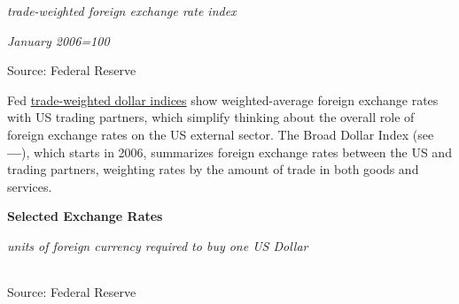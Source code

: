 \documentclass{report}
\makeatletter
\newcommand{\tbllink}[1]{\href{https://raw.githubusercontent.com/bdecon/US-chartbook/master/chartbook/data/#1}{\faTable}}
\newcommand*\short[1]{\expandafter\@gobbletwo\number\numexpr#1\relax}
\newcommand{\dateaxisticks}{
		date coordinates in=x, axis line style={draw=none},
		xmax={2020-08-10},
		max space between ticks=40,	    
		xtick={{1990-01-01}, {1992-01-01}, {1994-01-01}, 
			{1996-01-01}, {1998-01-01}, {2000-01-01}, 
			{2002-01-01}, {2004-01-01}, {2006-01-01},
			{2008-01-01}, {2010-01-01}, {2012-01-01}, {2014-01-01},
		    {2016-01-01}, {2018-01-01}, {2020-01-01}},
		minor xtick={{1989-01-01}, {1991-01-01}, {1993-01-01},
			{1995-01-01}, {1997-01-01}, {1999-01-01}, 
			{2001-01-01}, {2003-01-01}, {2005-01-01}, {2007-01-01},
		    {2009-01-01}, {2011-01-01}, {2013-01-01}, {2015-01-01},
		    {2017-01-01}, {2019-01-01}},
		enlarge y limits={0.06}, enlarge x limits={0.01},
		}
\newcommand{\bbar}[2]{extra #1 ticks = {{#2}}, extra #1 tick labels = ,
		extra #1 tick style = {grid=major, grid style={thick, black!25}},}
\newcommand{\stdline}[4]{\addplot[very thick, no markers, color=#1] 
		table [x=#2, y=#3, col sep=comma] {#4};	}
\newcommand{\rbars}{
		\fill[color=black!10] (axis cs:{1990-07-01},\pgfkeysvalueof{/pgfplots/ymin}) rectangle 
			(axis cs:{1991-03-01}, \pgfkeysvalueof{/pgfplots/ymax});
		\fill[color=black!10] (axis cs:{2007-12-01},\pgfkeysvalueof{/pgfplots/ymin}) rectangle 
			(axis cs:{2009-07-01}, \pgfkeysvalueof{/pgfplots/ymax});
		\fill[color=black!10] (axis cs:{2001-03-01},\pgfkeysvalueof{/pgfplots/ymin}) rectangle 
			(axis cs:{2001-11-01}, \pgfkeysvalueof{/pgfplots/ymax});
		\fill[color=black!10] (axis cs:{2020-02-01},\pgfkeysvalueof{/pgfplots/ymin}) rectangle 
			(axis cs:{2020-09-01}, \pgfkeysvalueof{/pgfplots/ymax});}
\makeatother
\begin{document}
{{{{{{\begin{minipage}{0.33\textwidth}
\footnotesize{\textit{trade-weighted foreign exchange rate index}}

\footnotesize{\textit{January 2006=100}}

\hspace*{-2mm} 

\footnotesize{Source: Federal Reserve} \hfill \tbllink{fx_idx.csv}
\end{minipage}\hspace{8mm}
\begin{minipage}{0.375\textwidth}
\small Fed \href{https://www.federalreserve.gov/releases/h10/summary/default.htm}{trade-weighted dollar indices} show weighted-average foreign exchange rates with US trading partners, which simplify thinking about the overall role of foreign exchange rates on the US external sector. The Broad Dollar Index (see {\color{blue!60!black}\textbf{---}}), which starts in 2006, summarizes foreign exchange rates between the US and trading partners, weighting rates by the amount of trade in both goods and services.\\


\end{minipage}

\newpage

\normalsize \textbf{Selected Exchange Rates}
\vspace{-2mm}

\footnotesize{\textit{units of foreign currency required to buy one US Dollar}}
\vspace{-1mm}

 \setlength{\tabcolsep}{3.0pt} \color{black!90}
		{\renewcommand{\arraystretch}{1.52}
		 \hspace{-1mm}\begin{tabular}{p{16mm} R{15mm} R{15mm} R{15mm} R{14.5mm} 
		 				 R{14.5mm} R{14.5mm}}
			 \hline
		\end{tabular}}	
	
\footnotesize{Source: Federal Reserve}

\newpage
}}}}}}
\end{document}
